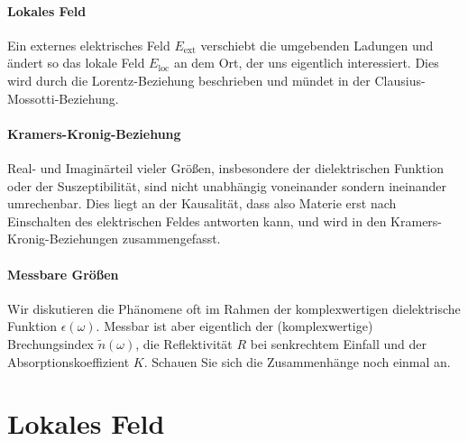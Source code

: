 \paragraph*{Lokales Feld} Ein externes elektrisches Feld $E_\text{ext}$ verschiebt die umgebenden Ladungen und ändert so das lokale Feld $E_\text{loc}$ an dem Ort, der uns eigentlich interessiert. Dies wird durch die Lorentz-Beziehung beschrieben und mündet in der Clausius-Mossotti-Beziehung.

\paragraph*{Kramers-Kronig-Beziehung} Real- und Imaginärteil vieler Größen, insbesondere der dielektrischen Funktion oder der Suszeptibilität, sind nicht unabhängig voneinander  sondern ineinander umrechenbar. Dies liegt an der Kausalität, dass also Materie erst nach Einschalten des elektrischen Feldes antworten kann, und wird in den Kramers-Kronig-Beziehungen zusammengefasst.

\paragraph*{Messbare Größen} Wir diskutieren die Phänomene oft im Rahmen der komplexwertigen dielektrische Funktion $\epsilon(\omega)$. Messbar ist aber eigentlich der (komplexwertige) Brechungsindex $\tilde{n}(\omega)$, die Reflektivität $R$ bei senkrechtem Einfall und der Absorptionskoeffizient $K$. Schauen Sie sich die Zusammenhänge noch einmal an.

\section*{Lokales Feld}

